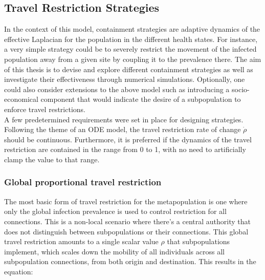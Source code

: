 \subsection{Travel Restriction Strategies}
In the context of this model, containment strategies are adaptive dynamics of the effective Laplacian for the population in the different health states. For instance, a very simple strategy could be to severely restrict the movement of the infected population away from a given site by coupling it to the prevalence there. The aim of this thesis is to devise and explore different containment strategies as well as investigate their effectiveness through numerical simulations. Optionally, one could also consider extensions to the above model such as introducing a socio-economical component that would indicate the desire of a subpopulation to enforce travel restrictions\cite{colizza2007reaction}.\\


A few predetermined requirements were set in place for designing strategies. Following the theme of an ODE model, the travel restriction rate of change $\dot \rho$ should be continuous. Furthermore, it is preferred if the dynamics of the travel restriction are contained in the range from 0 to 1, with no need to artificially clamp the value to that range.

\subsubsection{Global proportional travel restriction}
The most basic form of travel restriction for the metapopulation is one where only the global infection prevalence is used to control restriction for all connections. This is a non-local scenario where there's a central authority that does not distinguish between subpopulations or their connections. This global travel restriction amounts to a single scalar value $\rho$ that subpopulations implement, which scales down the mobility of all individuals across all subpopulation connections, from both origin and destination. This results in the equation:

